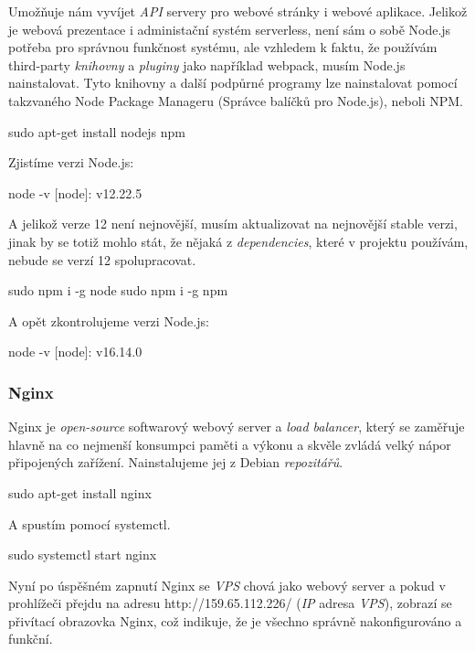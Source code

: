 \documentclass[12pt,a4paper]{report}
\begin{document}
  Umožňuje nám vyvíjet \emph{API} servery pro webové stránky i webové aplikace. 
  Jelikož je webová prezentace i administační systém serverless, není sám o sobě Node.js potřeba pro správnou funkčnost systému,
   ale vzhledem k faktu, že
  používám third-party \emph{knihovny} a \emph{pluginy} jako například webpack, musím Node.js nainstalovat. Tyto knihovny a další podpůrné programy 
  lze nainstalovat pomocí takzvaného Node Package Manageru (Správce balíčků pro Node.js), neboli NPM.
  \begin{bash}
    sudo apt-get install nodejs npm
  \end{bash}
  Zjistíme verzi Node.js:
  \begin{bash}
    node -v
    [node]: v12.22.5
  \end{bash}
  \clearpage
  A jelikož verze 12 není nejnovější, musím aktualizovat na nejnovější stable verzi, jinak by se totiž mohlo stát, 
  že nějaká z \emph{dependencies}, které v projektu používám, nebude se verzí 12 spolupracovat.
  \begin{bash}
    sudo npm i -g node
    sudo npm i -g npm
  \end{bash}
  A opět zkontrolujeme verzi Node.js:
  \begin{bash}
    node -v
    [node]: v16.14.0
  \end{bash}
  \subsubsection{Nginx}
  Nginx je \emph{open-source} softwarový webový server a  \emph{load balancer}, který se zaměřuje hlavně na co
  nejmenší konsumpci paměti a výkonu a skvěle zvládá velký nápor připojených zařížení.
  Nainstalujeme jej z Debian \emph{repozitářů}.
  \begin{bash}
    sudo apt-get install nginx
  \end{bash}
  A spustím pomocí systemctl.
  \begin{bash}
    sudo systemctl start nginx
  \end{bash}
  Nyní po úspěšném zapnutí Nginx se \emph{VPS} chová jako webový server a pokud v prohlížeči přejdu na adresu http://159.65.112.226/ (\emph{IP} adresa \emph{VPS}),
   zobrazí se přivítací obrazovka Nginx, což indikuje, že je všechno správně nakonfigurováno a funkční. 
  
\end{document}
